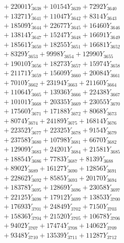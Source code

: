 \documentclass[a4paper,10pt]{article}
\begin{document}
{\begin{align}
&\;  + 22001 Y_{3638} + 10154 Y_{3639} + 7292 Y_{3640} \\[0.3ex]
&\;  + 13271 Y_{3641} + 11047 Y_{3642} + 8314 Y_{3643} \\[0.3ex]
&\;  + 18509 Y_{3644} + 22677 Y_{3645} + 16460 Y_{3646} \\[0.3ex]
&\;  + 13814 Y_{3647} + 15247 Y_{3648} + 16691 Y_{3649} \\[0.3ex]
&\;  + 18561 Y_{3650} + 18255 Y_{3651} + 16681 Y_{3652} \\[0.3ex]
&\;  + 8329 Y_{3653} + 9998 Y_{3654} + 12990 Y_{3655} \\[0.3ex]
&\;  + 19010 Y_{3656} + 18273 Y_{3657} + 15974 Y_{3658} \\[0.5ex]\allowbreak
&\;  + 21171 Y_{3659} + 15609 Y_{3660} + 20084 Y_{3661} \\[0.3ex]
&\;  + 7010 Y_{3662} + 23194 Y_{3663} + 21160 Y_{3664} \\[0.3ex]
&\;  + 11064 Y_{3665} + 13936 Y_{3666} + 22438 Y_{3667} \\[0.3ex]
&\;  + 10101 Y_{3668} + 20335 Y_{3669} + 23055 Y_{3670} \\[0.3ex]
&\;  + 17560 Y_{3671} + 17188 Y_{3672} + 8068 Y_{3673} \\[0.3ex]
&\;  + 8074 Y_{3674} + 24189 Y_{3675} + 16814 Y_{3676} \\[0.3ex]
&\;  + 22352 Y_{3677} + 22325 Y_{3678} + 9154 Y_{3679} \\[0.3ex]
&\;  + 23758 Y_{3680} + 10798 Y_{3681} + 6670 Y_{3682} \\[0.3ex]
&\;  + 12909 Y_{3683} + 24201 Y_{3684} + 21581 Y_{3685} \\[0.3ex]
&\;  + 18854 Y_{3686} + 7783 Y_{3687} + 8139 Y_{3688} \\[0.5ex]\allowbreak
&\;  + 8902 Y_{3689} + 16127 Y_{3690} + 12856 Y_{3691} \\[0.3ex]
&\;  + 22862 Y_{3692} + 8585 Y_{3693} + 20170 Y_{3694} \\[0.3ex]
&\;  + 18378 Y_{3695} + 12869 Y_{3696} + 23058 Y_{3697} \\[0.3ex]
&\;  + 22125 Y_{3698} + 17912 Y_{3699} + 13853 Y_{3700} \\[0.3ex]
&\;  + 17693 Y_{3701} + 24849 Y_{3702} + 7150 Y_{3703} \\[0.3ex]
&\;  + 15836 Y_{3704} + 21520 Y_{3705} + 10678 Y_{3706} \\[0.3ex]
&\;  + 9402 Y_{3707} + 17474 Y_{3708} + 14062 Y_{3709} \\[0.3ex]
&\;  + 9348 Y_{3710} + 13539 Y_{3711} + 11287 Y_{3712} \\[0.3ex]

\end{align}}
\end{document}
